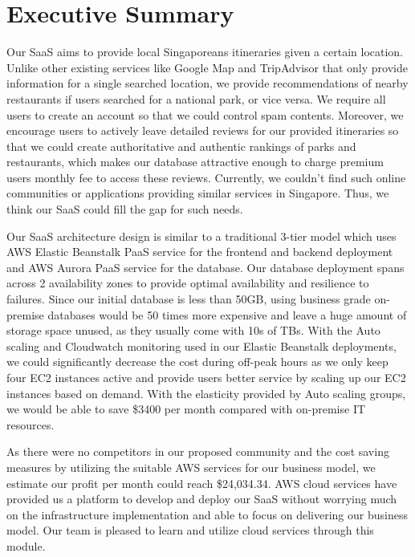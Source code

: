 \documentclass[12pt,a4paper]{article}
\begin{document}

\newpage
\setcounter{page}{1}

\section{Executive Summary}

Our SaaS aims to provide local Singaporeans itineraries given a certain location. Unlike other existing services like Google Map and TripAdvisor that only provide information for a single searched location, we provide recommendations of nearby restaurants if users searched for a national park, or vice versa. We require all users to create an account so that we could control spam contents. Moreover, we encourage users to actively leave detailed reviews for our provided itineraries so that we could create authoritative and authentic rankings of parks and restaurants, which makes our database attractive enough to charge premium users monthly fee to access these reviews. Currently, we couldn’t find such online communities or applications providing similar services in Singapore. Thus, we think our SaaS could fill the gap for such needs. 

Our SaaS architecture design is similar to a traditional 3-tier model which uses AWS Elastic Beanstalk PaaS service for the frontend and backend deployment and AWS Aurora PaaS service for the database. Our database deployment spans across 2 availability zones to provide optimal availability and resilience to failures. Since our initial database is less than 50GB, using business grade on-premise databases would be 50 times more expensive and leave a huge amount of storage space unused, as they usually come with 10s of TBs. With the Auto scaling and Cloudwatch monitoring used in our Elastic Beanstalk deployments, we could significantly decrease the cost during off-peak hours as we only keep four EC2 instances active and provide users better service by scaling up our EC2 instances based on demand. With the elasticity provided by Auto scaling groups, we would be able to save \$3400 per month compared with on-premise IT resources.

As there were no competitors in our proposed community and the cost saving measures by utilizing the suitable AWS services for our business model, we estimate our profit per month could reach \$24,034.34. AWS cloud services have provided us a platform to develop and deploy our SaaS without worrying much on the infrastructure implementation and able to focus on delivering our business model. Our team is pleased to learn and utilize cloud services through this module.
\end{document}
